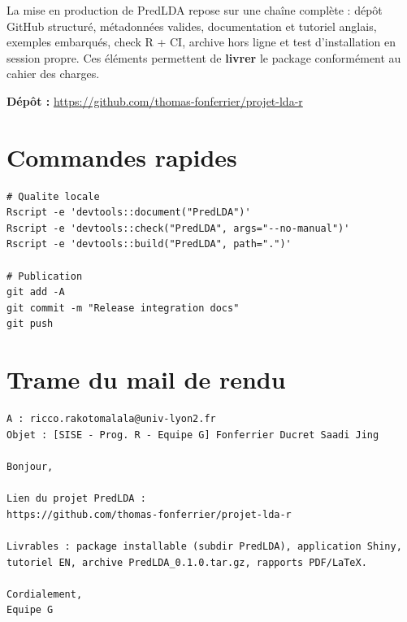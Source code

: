 \documentclass[11pt,a4paper]{article}
\begin{document}
La mise en production de PredLDA repose sur une cha\^ine compl\`ete : d\'ep\^ot
GitHub structur\'e, m\'etadonn\'ees valides, documentation et tutoriel anglais,
exemples embarqu\'es, check R + CI, archive hors ligne et test d'installation en
session propre. Ces \'el\'ements permettent de \textbf{livrer} le package
conform\'ement au cahier des charges.

\vspace{1em}
\noindent\textbf{D\'ep\^ot :}
\url{https://github.com/thomas-fonferrier/projet-lda-r}

\appendix
\section{Commandes rapides}

\begin{lstlisting}
# Qualite locale
Rscript -e 'devtools::document("PredLDA")'
Rscript -e 'devtools::check("PredLDA", args="--no-manual")'
Rscript -e 'devtools::build("PredLDA", path=".")'

# Publication
git add -A
git commit -m "Release integration docs"
git push
\end{lstlisting}

\section{Trame du mail de rendu}

\begin{lstlisting}
A : ricco.rakotomalala@univ-lyon2.fr
Objet : [SISE - Prog. R - Equipe G] Fonferrier Ducret Saadi Jing

Bonjour,

Lien du projet PredLDA :
https://github.com/thomas-fonferrier/projet-lda-r

Livrables : package installable (subdir PredLDA), application Shiny,
tutoriel EN, archive PredLDA_0.1.0.tar.gz, rapports PDF/LaTeX.

Cordialement,
Equipe G
\end{lstlisting}
\end{document}
